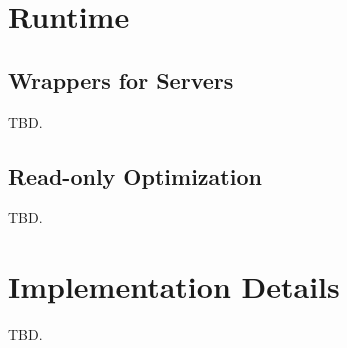\section{Runtime} \label{sec:runtime}

\subsection{Wrappers for Servers} \label{sec:wrapper}

TBD.

\subsection{Read-only Optimization} \label{sec:readopt}

TBD.

\section{Implementation Details} \label{sec:impl}

TBD.